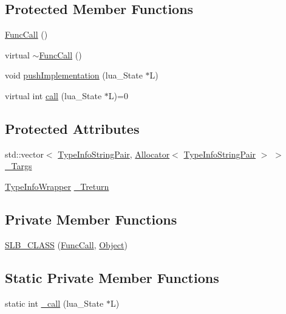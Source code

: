 \subsection*{Protected Member Functions}
\begin{DoxyCompactItemize}
\item 
\hyperlink{classSLB_1_1FuncCall_a9630c6f24bb0f40037674b1d76471f2a}{Func\+Call} ()
\item 
virtual \hyperlink{classSLB_1_1FuncCall_a85626ff3e34bdfca7140850c481281d6}{$\sim$\+Func\+Call} ()
\item 
void \hyperlink{classSLB_1_1FuncCall_a8929e16bd0efb7e8fb94b36fc0570f04}{push\+Implementation} (lua\+\_\+\+State $\ast$L)
\item 
virtual int \hyperlink{classSLB_1_1FuncCall_add5a4f72225cf4a190f66fc7bceac1b8}{call} (lua\+\_\+\+State $\ast$L)=0
\end{DoxyCompactItemize}
\subsection*{Protected Attributes}
\begin{DoxyCompactItemize}
\item 
std\+::vector$<$ \hyperlink{classSLB_1_1FuncCall_a29ced3919d9548581c8d6893b2af305b}{Type\+Info\+String\+Pair}, \hyperlink{classSLB_1_1Allocator}{Allocator}$<$ \hyperlink{classSLB_1_1FuncCall_a29ced3919d9548581c8d6893b2af305b}{Type\+Info\+String\+Pair} $>$ $>$ \hyperlink{classSLB_1_1FuncCall_ad9bc8105dc36a15d4575fecfaf6095ce}{\+\_\+\+Targs}
\item 
\hyperlink{classSLB_1_1TypeInfoWrapper}{Type\+Info\+Wrapper} \hyperlink{classSLB_1_1FuncCall_a95da897833858c42336b06ef321966e4}{\+\_\+\+Treturn}
\end{DoxyCompactItemize}
\subsection*{Private Member Functions}
\begin{DoxyCompactItemize}
\item 
\hyperlink{classSLB_1_1FuncCall_ac37c4100267780f1adaeb3bb34c9ca12}{S\+L\+B\+\_\+\+C\+L\+A\+SS} (\hyperlink{classSLB_1_1FuncCall}{Func\+Call}, \hyperlink{classSLB_1_1Object}{Object})
\end{DoxyCompactItemize}
\subsection*{Static Private Member Functions}
\begin{DoxyCompactItemize}
\item 
static int \hyperlink{classSLB_1_1FuncCall_a7bbaa75b5e03b699024b6e1f27ca11b5}{\+\_\+call} (lua\+\_\+\+State $\ast$L)
\end{DoxyCompactItemize}
